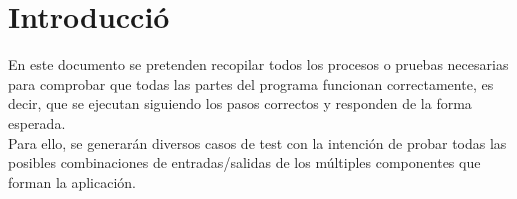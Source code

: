 \section{Introducció}\label{sec:intro}


En este documento se pretenden recopilar todos los procesos o pruebas necesarias para comprobar que todas las partes del programa funcionan correctamente, es decir, que se ejecutan siguiendo los pasos correctos y responden de la forma esperada. \\ Para ello, se generarán diversos casos de test con la intención de probar todas las posibles combinaciones de entradas/salidas de los múltiples componentes que forman la aplicación.